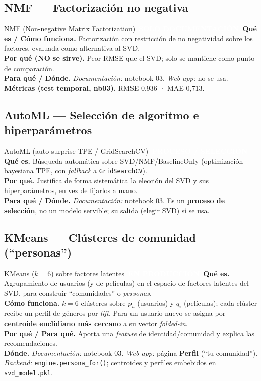\documentclass[11pt,a4paper]{article}
\newcommand{\code}[1]{\textcolor{omnidark}{\texttt{#1}}}
\newcommand{\enprod}{\textcolor{white}{\colorbox{omniaccent}{\scriptsize\bfseries\,EN PRODUCCIÓN\,}}}
\newcommand{\noserv}{\textcolor{white}{\colorbox{omnigray}{\scriptsize\bfseries\,SOLO DOCUMENTACIÓN\,}}}
\newcommand{\proceso}{\textcolor{white}{\colorbox{omnigold}{\scriptsize\bfseries\,PROCESO / SELECCIÓN\,}}}
\begin{document}
\subsection{NMF — Factorización no negativa}
\begin{modelcard}{NMF (Non-negative Matrix Factorization) \hfill \noserv}
\textbf{Qué es / Cómo funciona.} Factorización con restricción de no negatividad sobre los factores, evaluada como alternativa al SVD.\\[3pt]
\textbf{Por qué (NO se sirve).} Peor RMSE que el SVD; solo se mantiene como punto de comparación.\\[3pt]
\textbf{Para qué / Dónde.} \emph{Documentación:} notebook 03. \emph{Web-app:} no se usa.\\[3pt]
\textbf{Métricas (test temporal, nb03).} RMSE 0,936 · MAE 0,713.
\end{modelcard}

\subsection{AutoML — Selección de algoritmo e hiperparámetros}
\begin{modelcard}{AutoML (auto-surprise TPE / GridSearchCV) \hfill \proceso}
\textbf{Qué es.} Búsqueda automática sobre SVD/NMF/BaselineOnly (optimización bayesiana TPE, con \textit{fallback} a \code{GridSearchCV}).\\[3pt]
\textbf{Por qué.} Justifica de forma sistemática la elección del SVD y sus hiperparámetros, en vez de fijarlos a mano.\\[3pt]
\textbf{Para qué / Dónde.} \emph{Documentación:} notebook 03. Es un \textbf{proceso de selección}, no un modelo servible; su salida (elegir SVD) sí se usa.
\end{modelcard}

\subsection{KMeans — Clústeres de comunidad (``personas'')}
\begin{modelcard}{KMeans ($k=6$) sobre factores latentes \hfill \enprod}
\textbf{Qué es.} Agrupamiento de usuarios (y de películas) en el espacio de factores latentes del SVD, para construir ``comunidades'' o \textit{personas}.\\[3pt]
\textbf{Cómo funciona.} $k=6$ clústeres sobre $p_u$ (usuarios) y $q_i$ (películas); cada clúster recibe un perfil de géneros por \textit{lift}. Para un usuario nuevo se asigna por \textbf{centroide euclidiano más cercano} a su vector \textit{folded-in}.\\[3pt]
\textbf{Por qué / Para qué.} Aporta una \textit{feature} de identidad/comunidad y explica las recomendaciones.\\[3pt]
\textbf{Dónde.} \emph{Documentación:} notebook 03. \emph{Web-app:} página \textbf{Perfil} (``tu comunidad''). \emph{Backend:} \code{engine.persona\_for()}; centroides y perfiles embebidos en \code{svd\_model.pkl}.
\end{modelcard}
\end{document}
